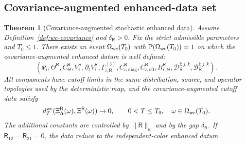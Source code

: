 \documentclass[10pt]{amsart}
\numberwithin{equation}{section}
\theoremstyle{plain}
\newtheorem{theorem}{Theorem}[section]
\theoremstyle{definition}
\theoremstyle{remark}
\newcommand{\Prob}{\mathbb{P}}
\begin{document}
\subsection{Covariance-augmented enhanced-data set}

\begin{theorem}[Covariance-augmented stochastic enhanced data]\label{thm:wc-enhanced-data}
Assume Definition~\ref{def:wc-covariance} and \(\delta_{\mathsf R}>0\).  Fix the strict admissible parameters and \(T_0\le1\).  There exists an event \(\Omega_{\rm wc}(T_0)\) with \(\Prob(\Omega_{\rm wc}(T_0))=1\) on which the covariance-augmented enhanced datum is well defined:
\begin{equation}\label{eq:wc-enhanced-data-list}
        (\Psi_i,\Theta^{\mathsf R},C_\Theta^{\mathsf R},V_i^{\mathsf R},\partial_tV_i^{\mathsf R},
        \Gamma_{i,\mathsf R}^{(3)},C_{i,\mathrm{diag}}^{\mathsf R},C_{i,\mathrm{off}}^{\mathsf R},R_{i,\Theta}^{\mathsf R},
        \mathcal D_{\mathsf R}^{i;j,k},\mathcal B_{\mathsf R}^{i;j,k}).
\end{equation}
All components have cutoff limits in the same distribution, source, and operator topologies used by the deterministic map, and the covariance-augmented cutoff data satisfy
\[
        d_T^{\rm wc}(\Xi_\Lambda^{\mathsf R}(\omega),\Xi^{\mathsf R}(\omega))\to0,
        \qquad 0<T\le T_0,
        \quad \omega\in\Omega_{\rm wc}(T_0).
\]
The additional constants are controlled by \(\|\mathsf R\|_\kappa\) and by the gap \(\delta_{\mathsf R}\).  If \(\mathsf R_{12}=\mathsf R_{21}=0\), the data reduce to the independent-color enhanced datum.
\end{theorem}
\end{document}
